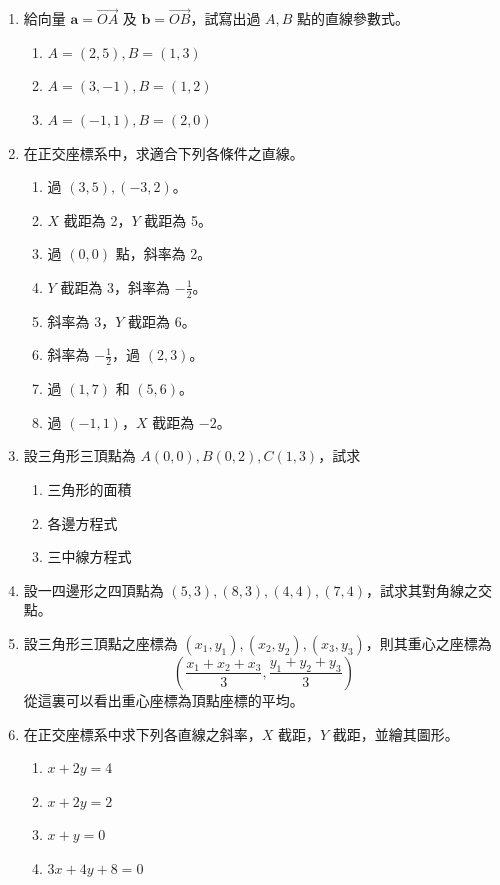 \begin{enumerate}[label=\arabic*., leftmargin=2em]
  \item 給向量 $\mathbf{a} = \vec{OA}$ 及 $\mathbf{b} = \vec{OB}$，試寫出過 $A, B$ 點的直線參數式。
  \begin{enumerate}[label=(\roman*), leftmargin=2em]
    \item $A = (2, 5), B = (1, 3)$
    \item $A = (3, -1), B = (1, 2)$
    \item $A = (-1, 1), B = (2, 0)$
  \end{enumerate}
  
  \item 在正交座標系中，求適合下列各條件之直線。
  \begin{enumerate}[label=(\roman*), leftmargin=2em]
    \item 過 $(3, 5), (-3, 2)$。
    \item $X$ 截距為 2，$Y$ 截距為 5。
    \item 過 $(0, 0)$ 點，斜率為 2。
    \item $Y$ 截距為 3，斜率為 $-\frac{1}{2}$。
    \item 斜率為 3，$Y$ 截距為 6。
    \item 斜率為 $-\frac{1}{2}$，過 $(2, 3)$。
    \item 過 $(1, 7)$ 和 $(5, 6)$。
    \item 過 $(-1, 1)$，$X$ 截距為 $-2$。
  \end{enumerate}
  
  \item 設三角形三頂點為 $A(0, 0), B(0, 2), C(1, 3)$，試求
  \begin{enumerate}[label=(\roman*), leftmargin=2em]
    \item 三角形的面積
    \item 各邊方程式
    \item 三中線方程式
  \end{enumerate}
  
  \item 設一四邊形之四頂點為 $(5, 3), (8, 3), (4, 4), (7, 4)$，試求其對角線之交點。
  
  \item 設三角形三頂點之座標為 $(x_1, y_1), (x_2, y_2), (x_3, y_3)$，則其重心之座標為
  \[ \left( \frac{x_1 + x_2 + x_3}{3}, \frac{y_1 + y_2 + y_3}{3} \right) \]
  從這裏可以看出重心座標為頂點座標的平均。
  
  \item 在正交座標系中求下列各直線之斜率，$X$ 截距，$Y$ 截距，並繪其圖形。
  \begin{enumerate}[label=(\roman*), leftmargin=2em]
    \item $x + 2y = 4$
    \item $x + 2y = 2$
    \item $x + y = 0$
    \item $3x + 4y + 8 = 0$
  \end{enumerate}
  

\end{enumerate}
